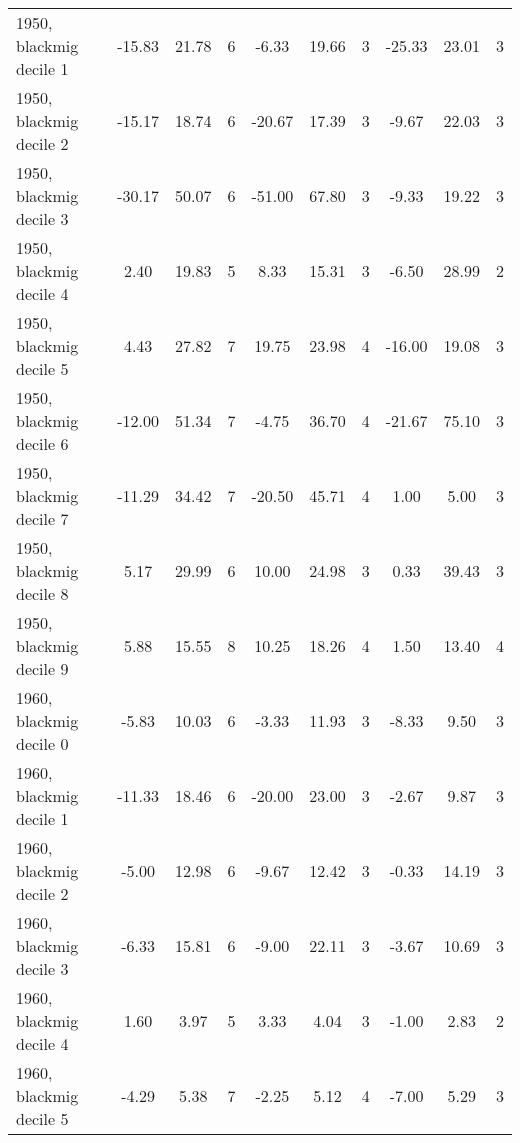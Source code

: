 \begin{table}[htbp]
\begin{tabular}{l*{3}{ccc}}
1950, blackmig decile 1&      -15.83&       21.78&           6&       -6.33&       19.66&           3&      -25.33&       23.01&           3\\
1950, blackmig decile 2&      -15.17&       18.74&           6&      -20.67&       17.39&           3&       -9.67&       22.03&           3\\
1950, blackmig decile 3&      -30.17&       50.07&           6&      -51.00&       67.80&           3&       -9.33&       19.22&           3\\
1950, blackmig decile 4&        2.40&       19.83&           5&        8.33&       15.31&           3&       -6.50&       28.99&           2\\
1950, blackmig decile 5&        4.43&       27.82&           7&       19.75&       23.98&           4&      -16.00&       19.08&           3\\
1950, blackmig decile 6&      -12.00&       51.34&           7&       -4.75&       36.70&           4&      -21.67&       75.10&           3\\
1950, blackmig decile 7&      -11.29&       34.42&           7&      -20.50&       45.71&           4&        1.00&        5.00&           3\\
1950, blackmig decile 8&        5.17&       29.99&           6&       10.00&       24.98&           3&        0.33&       39.43&           3\\
1950, blackmig decile 9&        5.88&       15.55&           8&       10.25&       18.26&           4&        1.50&       13.40&           4\\
1960, blackmig decile 0&       -5.83&       10.03&           6&       -3.33&       11.93&           3&       -8.33&        9.50&           3\\
1960, blackmig decile 1&      -11.33&       18.46&           6&      -20.00&       23.00&           3&       -2.67&        9.87&           3\\
1960, blackmig decile 2&       -5.00&       12.98&           6&       -9.67&       12.42&           3&       -0.33&       14.19&           3\\
1960, blackmig decile 3&       -6.33&       15.81&           6&       -9.00&       22.11&           3&       -3.67&       10.69&           3\\
1960, blackmig decile 4&        1.60&        3.97&           5&        3.33&        4.04&           3&       -1.00&        2.83&           2\\
1960, blackmig decile 5&       -4.29&        5.38&           7&       -2.25&        5.12&           4&       -7.00&        5.29&           3\\

\end{tabular}
\end{table}
